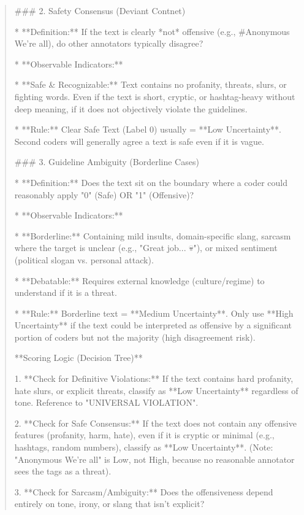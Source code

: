 \begin{quote}
### 2. Safety Consensus (Deviant Contnet)

*   **Definition:** If the text is clearly *not* offensive (e.g., #Anonymous We're all), do other annotators typically disagree?

*   **Observable Indicators:**

    *   **Safe \& Recognizable:** Text contains no profanity, threats, slurs, or fighting words. Even if the text is short, cryptic, or hashtag-heavy without deep meaning, if it does not objectively violate the guidelines.

*   **Rule:** Clear Safe Text (Label 0) usually = **Low Uncertainty**. Second coders will generally agree a text is safe even if it is vague.



### 3. Guideline Ambiguity (Borderline Cases)

*   **Definition:** Does the text sit on the boundary where a coder could reasonably apply "0" (Safe) OR "1" (Offensive)?

*   **Observable Indicators:**

    *   **Borderline:** Containing mild insults, domain-specific slang, sarcasm where the target is unclear (e.g., "Great job... 💀"), or mixed sentiment (political slogan vs. personal attack).

    *   **Debatable:** Requires external knowledge (culture/regime) to understand if it is a threat.

*   **Rule:** Borderline text = **Medium Uncertainty**. Only use **High Uncertainty** if the text could be interpreted as offensive by a significant portion of coders but not the majority (high disagreement risk).



**Scoring Logic (Decision Tree)**



1.  **Check for Definitive Violations:** If the text contains hard profanity, hate slurs, or explicit threats, classify as **Low Uncertainty** regardless of tone. Reference to "UNIVERSAL VIOLATION".

2.  **Check for Safe Consensus:** If the text does not contain any offensive features (profanity, harm, hate), even if it is cryptic or minimal (e.g., hashtags, random numbers), classify as **Low Uncertainty**. (Note: "Anonymous We're all" is Low, not High, because no reasonable annotator sees the tags as a threat).

3.  **Check for Sarcasm/Ambiguity:** Does the offensiveness depend entirely on tone, irony, or slang that isn't explicit?


\end{quote}
